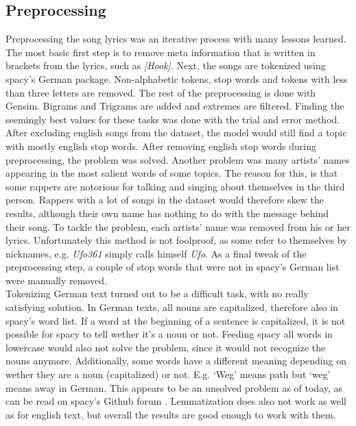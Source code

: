 \documentclass[conference]{IEEEtran}
\begin{document}
\subsection{Preprocessing} \label{preprocessing}
Preprocessing the song lyrics was an iterative process with many lessons learned. The most basic first step is to remove meta information that is written in brackets from the lyrics, such as \textit{[Hook]}. Next, the songs are tokenized using spacy's German package. Non-alphabetic tokens, stop words and tokens with less than three letters are removed. The rest of the preprocessing is done with Gensim. Bigrams and Trigrams are added and extremes are filtered. Finding the seemingly best values for these tasks was done with the trial and error method.\\
After excluding english songs from the dataset, the model would still find a topic with mostly english stop words. After removing english stop words during preprocessing, the problem was solved. Another problem was many artists' names appearing in the most salient words of some topics. The reason for this, is that some rappers are notorious for talking and singing about themselves in the third person. Rappers with a lot of songs in the dataset would therefore skew the results, although their own name has nothing to do with the message behind their song. To tackle the problem, each artists' name was removed from his or her lyrics. Unfortunately this method is not foolproof, as some refer to themselves by nicknames, e.g. \textit{Ufo361} simply calls himself \textit{Ufo}. As a final tweak of the preprocessing step, a couple of stop words that were not in spacy's German list were manually removed.\\
Tokenizing German text turned out to be a difficult task, with no really satisfying solution. In German texts, all nouns are capitalized, therefore also in spacy's word list. If a word at the beginning of a sentence is capitalized, it is not possible for spacy to tell wether it's a noun or not. Feeding spacy all words in lowercase would also not solve the problem, since it would not recognize the nouns anymore. Additionally, some words have a different meaning depending on wether they are a noun (capitalized) or not. E.g. {\lq}Weg{\rq} means path but {\lq}weg{\rq} means away in German. This appears to be an unsolved problem as of today, as can be read on spacy's Github forum \cite{spacy_issues}. Lemmatization does also not work as well as for english text, but overall the results are good enough to work with them.
\end{document}
